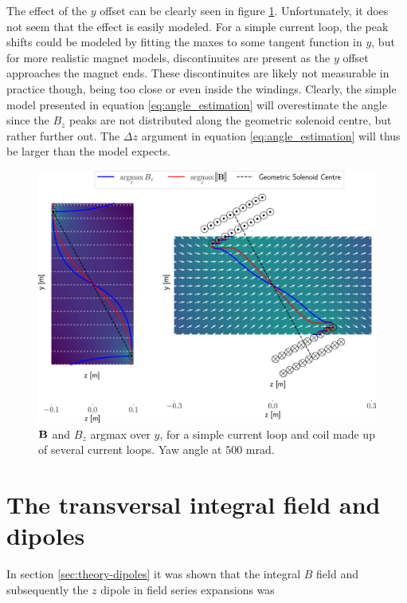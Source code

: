 The effect of the $y$ offset can be clearly seen in figure
\ref{fig:sim-mag-fieldmap-argmax}. Unfortunately, it does not seem
that the effect is easily modeled. For a simple current loop, the peak
shifts could be modeled by fitting the maxes to some tangent function
in $y$, but for more realistic magnet models, discontinuites are present as
the $y$ offset approaches the magnet ends. These discontinuites are
likely not measurable in practice though, being too close or even
inside the windings.
Clearly, the simple model
presented in equation \ref{eq:angle_estimation} will overestimate
the angle since the $B_z$ peaks are not distributed along the geometric
solenoid centre, but rather further out. The $\Delta z$ argument in
equation \ref{eq:angle_estimation} will thus be larger than the model
expects.


\begin{figure}[h!]
    \centering
    \includegraphics[width=\linewidth]{figs/sim-fieldmap}
    \caption{$\vb{B}$ and $B_z$ argmax over $y$, for a simple current
        loop and coil made up of several current loops. Yaw angle at $500$ mrad.}
    \label{fig:sim-mag-fieldmap-argmax}
\end{figure}

\section{The transversal integral field and dipoles}
\label{sec:dipole-simulations}
In section \ref{sec:theory-dipoles} it was shown that the integral
$B$ field and subsequently the $z$ dipole in field
series expansions was


